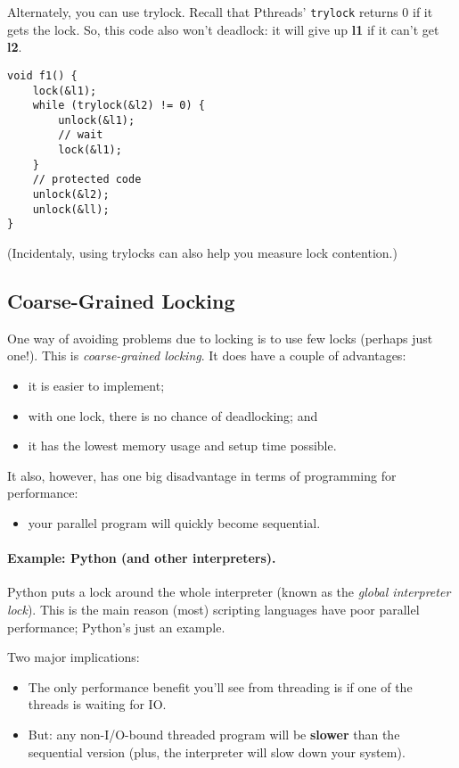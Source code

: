Alternately, you can use trylock. Recall that Pthreads' {\tt trylock}
returns 0 if it gets the lock.  So, this code also won't deadlock: it
will give up {\bf l1} if it can't get {\bf l2}.
  \begin{verbatim}
void f1() {
    lock(&l1);
    while (trylock(&l2) != 0) {
        unlock(&l1);
        // wait
        lock(&l1);
    }
    // protected code
    unlock(&l2);
    unlock(&ll);    
}
  \end{verbatim}
  (Incidentaly, using trylocks can also help you measure lock contention.)

\subsection*{Coarse-Grained Locking}
One way of avoiding problems due to locking is to use few locks
(perhaps just one!). This is \emph{coarse-grained locking}.
It does have a couple of advantages:
  \begin{itemize}
    \item it is easier to implement;
    \item with one lock, there is no chance of deadlocking; and
    \item it has the lowest memory usage and setup time possible.
  \end{itemize}

It also, however, has one big disadvantage in terms of programming for performance:
  \begin{itemize}
    \item your parallel program will quickly become sequential.
  \end{itemize}

\paragraph{Example: Python (and other interpreters).}
Python puts a lock around the whole interpreter (known as the
\emph{global interpreter lock}).  This is the main reason (most)
scripting languages have poor parallel performance; Python's just an
example.

Two major implications:
\begin{itemize}
\item The only performance benefit you'll see from threading is if one of the threads is
      waiting for IO.
\item But: any non-I/O-bound threaded program will be {\bf slower} than the sequential
      version (plus, the interpreter will slow down your system).
\end{itemize}

